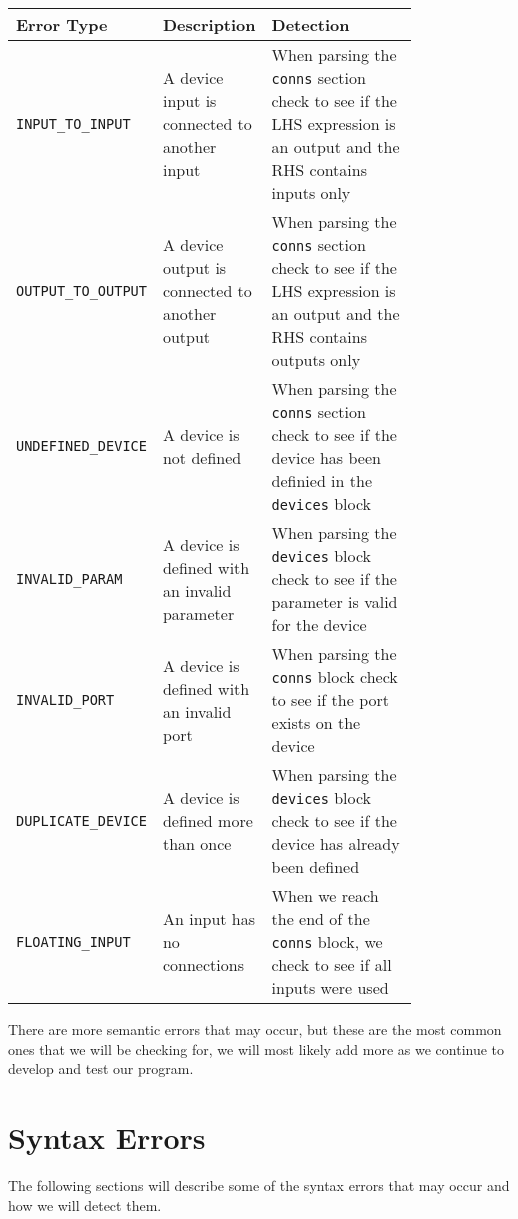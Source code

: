 \documentclass[10pt]{article}
\begin{document}

\begin{table}[h]
\centering
\begin{tabular}{@{}lp{0.2\linewidth}p{0.6\linewidth}@{}}
\toprule
\textbf{Error Type} & \textbf{Description} & \textbf{Detection}  \\ \midrule
\texttt{INPUT\_TO\_INPUT} & A device input is connected to another input &  When parsing the \texttt{conns} section check to see if the LHS expression is an output  and the RHS contains inputs only \\
\texttt{OUTPUT\_TO\_OUTPUT} & A device output is connected to another output & When parsing the \texttt{conns} section check to see if the LHS expression is an output and the RHS contains outputs only \\
\texttt{UNDEFINED\_DEVICE} & A device is not defined & When parsing the \texttt{conns} section check to see if the device has been definied in the \texttt{devices} block\\
\texttt{INVALID\_PARAM} & A device is defined with an invalid parameter & When parsing the \texttt{devices} block check to see if the parameter is valid for the device\\
\texttt{INVALID\_PORT} & A device is defined with an invalid port & When parsing the \texttt{conns} block check to see if the port exists on the device\\
\texttt{DUPLICATE\_DEVICE} & A device is defined more than once & When parsing the \texttt{devices} block check to see if the device has already been defined\\
\texttt{FLOATING\_INPUT} & An input has no connections & When we reach the end of the \texttt{conns} block, we check to see if all inputs were used \\

\bottomrule
\end{tabular}
\end{table}


There are more semantic errors that may occur, but these are the most common ones that we will be checking for,  we will most likely add more as we continue to develop and test our program.

\section{Syntax Errors}

The following sections will describe some of the syntax errors that may occur and how we will detect them. 
\end{document}
